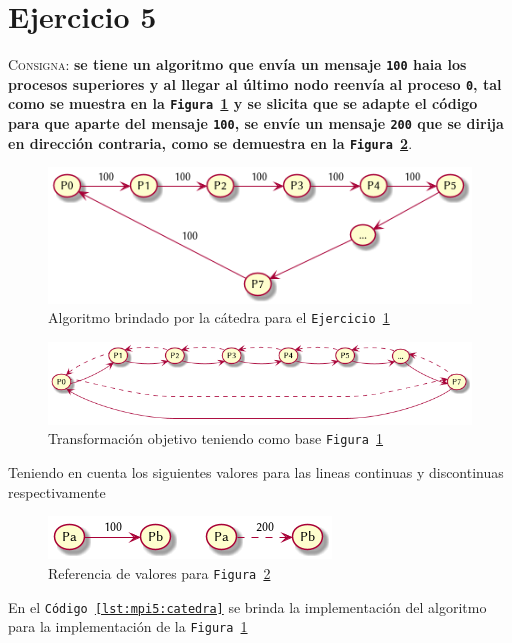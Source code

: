 \documentclass{article}
\begin{document}
\section{Ejercicio 5}
\label{sec:ej5}
\textsc{Consigna}: \textbf{se tiene un algoritmo que env\'ia un mensaje
\texttt{100} haia los procesos superiores y al llegar al \'ultimo nodo
reenv\'ia al proceso \texttt{0}, tal como se muestra en la \texttt{Figura
\ref{fig:ej5:a}} y se slicita que se adapte el c\'odigo para que aparte del
mensaje \texttt{100}, se env\'ie un mensaje \texttt{200} que se dirija en
direcci\'on contraria, como se demuestra en la \texttt{Figura
\ref{fig:ej5:b}}}.

\begin{figure}[H]
  \centering
  \includegraphics[width=.60\linewidth]{EJ5}
  \caption{Algoritmo brindado por la c\'atedra para el \texttt{Ejercicio
\ref{sec:ej5}}}
  \label{fig:ej5:a}
\end{figure}

\begin{figure}[H]
  \centering
  \includegraphics[width=.60\linewidth]{EJ5_001}
  \caption{Transformaci\'on objetivo teniendo como base \texttt{Figura
\ref{fig:ej5:a}}}
  \label{fig:ej5:b}
\end{figure}

Teniendo en cuenta los siguientes valores para las lineas continuas y
discontinuas respectivamente

\begin{figure}[H]
  \centering
  \includegraphics[width=.40\linewidth]{EJ5_002}
  \caption{Referencia de valores para \texttt{Figura \ref{fig:ej5:b}}}
  \label{fig:ej5:c}
\end{figure}

En el \texttt{C\'odigo \ref{lst:mpi5:catedra}} se brinda la implementaci\'on del
algoritmo para la implementaci\'on de la \texttt{Figura \ref{fig:ej5:a}}
\end{document}
